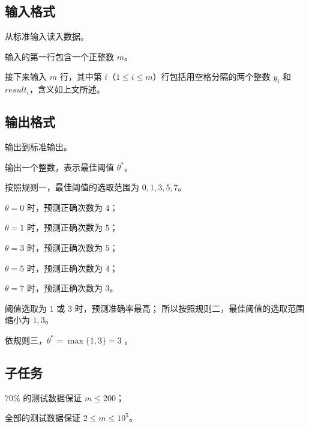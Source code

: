 \subsection*{输入格式}

从标准输入读入数据。

输入的第一行包含一个正整数 $m$。

接下来输入 $m$ 行，其中第 $i$（$1 \le i \le m$）行包括用空格分隔的两个整数 $y_i$ 和 $result_i$，含义如上文所述。


\subsection*{输出格式}

输出到标准输出。

输出一个整数，表示最佳阈值 $\theta^*$。

\examplebox*{}{}

按照规则一，最佳阈值的选取范围为 $0, 1, 3, 5, 7$。

$\theta = 0$ 时，预测正确次数为 $4$；

$\theta = 1$ 时，预测正确次数为 $5$；

$\theta = 3$ 时，预测正确次数为 $5$；

$\theta = 5$ 时，预测正确次数为 $4$；

$\theta = 7$ 时，预测正确次数为 $3$。

阈值选取为 $1$ 或 $3$ 时，预测准确率最高；
所以按照规则二，最佳阈值的选取范围缩小为 $1,3$。

依规则三，$\theta^*=\max\{1,3\}=3$
。


\subsection*{子任务}

$70\%$ 的测试数据保证 $m \le 200$；

全部的测试数据保证 $2 \le m \le 10^{5}$。


